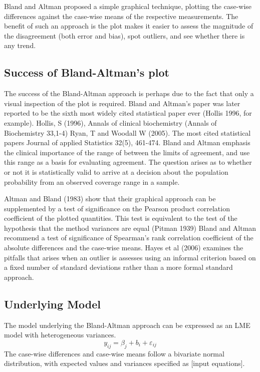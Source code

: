 \documentclass[12pt, a4paper]{report}
\theoremstyle{plain}
\theoremstyle{definition}
\theoremstyle{remark}
\begin{document}
Bland and Altman proposed a simple graphical technique, plotting the case-wise differences against the case-wise means of the respective measurements.
The benefit of such an approach is the plot makes it easier to assess the magnitude of the disagreement (both error and bias), spot outliers, and see whether there is any trend.

\subsection{Success of Bland-Altman’s plot}
The success of the Bland-Altman approach is perhaps due to the fact that only a visual inspection of the plot is required. Bland and Altman’s paper was later reported to be the sixth most widely cited statistical paper ever (Hollis 1996, for example).
Hollis, S (1996), Annals of clinical biochemistry (Annals of Biochemistry 33,1-4)
Ryan, T and Woodall W (2005). The most cited statistical papers Journal of applied Statistics 32(5), 461-474.
Bland and Altman emphasis the clinical importance of the range of between the limits of agreement, and use this range as a basis for evaluating agreement.
The question arises as to whether  or not it is statistically valid to arrive at a decision about the population probability from an observed coverage range in a sample.

Altman and Bland (1983) show that their graphical approach can be supplemented by a test of significance on the Pearson product correlation coefficient of the plotted quantities. This test is equivalent to the test of the hypothesis that the method variances are equal (Pitman 1939)
Bland and Altman recommend a test of significance of Spearman’s rank correlation coefficient of the absolute differences and the case-wise means.
Hayes et al (2006) examines the pitfalls that arises when an outlier is assesses using an informal criterion based on a fixed number of standard deviations rather than a more formal standard approach.
\subsection{Underlying Model}
The model underlying the Bland-Altman approach can be expressed as an LME model with heterogeneous variances.
\[y_{ij} = \beta_j + b_i  + \varepsilon_{ij}\]
The case-wise differences and case-wise means follow a bivariate normal distribution, with expected values and variances specified as [input equations].
\end{document}
